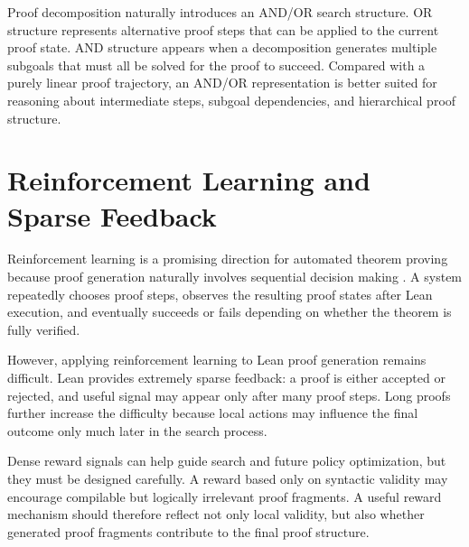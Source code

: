 Proof decomposition naturally introduces an AND/OR search structure. OR structure represents alternative proof steps that can be applied to the current proof state. AND structure appears when a decomposition generates multiple subgoals that must all be solved for the proof to succeed. Compared with a purely linear proof trajectory, an AND/OR representation is better suited for reasoning about intermediate steps, subgoal dependencies, and hierarchical proof structure.

\section{Reinforcement Learning and Sparse Feedback}
Reinforcement learning is a promising direction for automated theorem proving because proof generation naturally involves sequential decision making \citep{kaliszyk2018reinforcement,bansal2019holist}. A system repeatedly chooses proof steps, observes the resulting proof states after Lean execution, and eventually succeeds or fails depending on whether the theorem is fully verified.

However, applying reinforcement learning to Lean proof generation remains difficult. Lean provides extremely sparse feedback: a proof is either accepted or rejected, and useful signal may appear only after many proof steps. Long proofs further increase the difficulty because local actions may influence the final outcome only much later in the search process.

Dense reward signals can help guide search and future policy optimization, but they must be designed carefully. A reward based only on syntactic validity may encourage compilable but logically irrelevant proof fragments. A useful reward mechanism should therefore reflect not only local validity, but also whether generated proof fragments contribute to the final proof structure.

